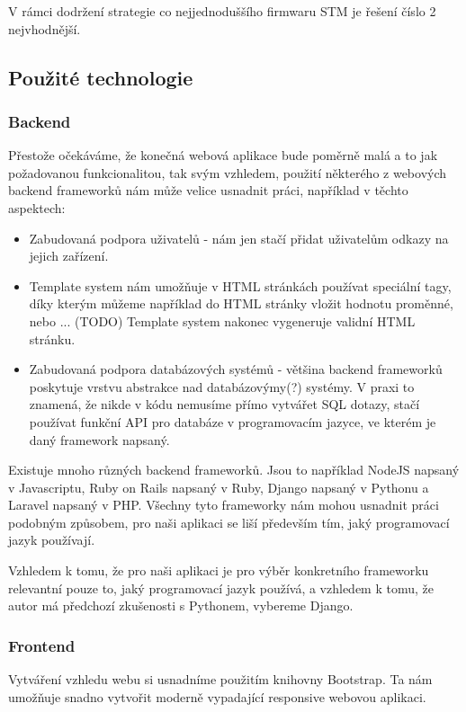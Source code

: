 V rámci dodržení strategie co nejjednoduššího firmwaru STM je řešení číslo 2 nejvhodnější.

\subsection{Použité technologie}

\subsubsection{Backend}
Přestože očekáváme, že konečná webová aplikace bude poměrně malá a to jak požadovanou funkcionalitou, tak svým
vzhledem, použití některého z webových backend frameworků nám může velice usnadnit práci, například v těchto
aspektech:
\begin{itemize}
    \item Zabudovaná podpora uživatelů - nám jen stačí přidat uživatelům odkazy na jejich
        zařízení.
    \item Template system nám umožňuje v HTML stránkách používat speciální
        tagy, díky kterým můžeme například do HTML stránky vložit hodnotu proměnné, nebo ... (TODO)
        Template system nakonec vygeneruje validní HTML stránku.
    \item Zabudovaná podpora databázových systémů - většina backend frameworků poskytuje vrstvu abstrakce nad
        databázovýmy(?) systémy. V praxi to znamená, že nikde v kódu nemusíme přímo vytvářet SQL dotazy,
        stačí používat funkční API pro databáze v programovacím jazyce, ve kterém je daný framework napsaný.
\end{itemize}

Existuje mnoho různých backend frameworků.
Jsou to například NodeJS napsaný v Javascriptu, Ruby on Rails napsaný v Ruby, Django napsaný v Pythonu a
Laravel napsaný v PHP. %
Všechny tyto frameworky nám mohou usnadnit práci podobným způsobem, pro naši aplikaci se liší především
tím, jaký programovací jazyk používají.

Vzhledem k tomu, že pro naši aplikaci je pro výběr konkretního frameworku relevantní pouze to, jaký programovací
jazyk používá, a vzhledem k tomu, že autor má předchozí zkušenosti s Pythonem, vybereme Django.

\subsubsection{Frontend}
Vytváření vzhledu webu si usnadníme použitím knihovny Bootstrap. %
Ta nám umožňuje snadno vytvořit moderně vypadající responsive webovou aplikaci. %

